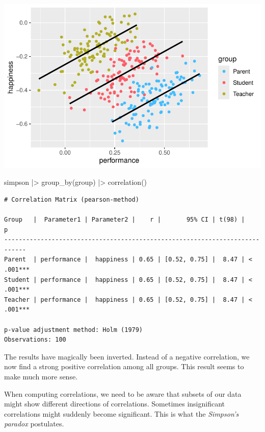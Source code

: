 \documentclass[
  letterpaper,
]{krantz}
\makeatletter
\newenvironment{Shaded}{\begin{snugshade}}{\end{snugshade}}
\newcommand{\FunctionTok}[1]{\textcolor[rgb]{0.28,0.35,0.67}{#1}}
\newcommand{\NormalTok}[1]{\textcolor[rgb]{0.00,0.23,0.31}{#1}}
\newcommand{\SpecialCharTok}[1]{\textcolor[rgb]{0.37,0.37,0.37}{#1}}
\newenvironment{kframe}{%
\medskip{}
\setlength{\fboxsep}{.8em}
 \def\at@end@of@kframe{}%
 \ifinner\ifhmode%
  \def\at@end@of@kframe{\end{minipage}}%
  \begin{minipage}{\columnwidth}%
 \fi\fi%
 \def\FrameCommand##1{\hskip\@totalleftmargin \hskip-\fboxsep
 \colorbox{shadecolor}{##1}\hskip-\fboxsep
     \hskip-\linewidth \hskip-\@totalleftmargin \hskip\columnwidth}%
 \MakeFramed {\advance\hsize-\width
   \@totalleftmargin\z@ \linewidth\hsize
   \@setminipage}}%
 {\par\unskip\endMakeFramed%
 \at@end@of@kframe}
\renewenvironment{Shaded}{\begin{kframe}}{\end{kframe}}
\makeatother
\begin{document}
\includegraphics{10_correlations_files/figure-latex/simpson-paradox-plot-groups-1.pdf}

\begin{Shaded}
\begin{Highlighting}[]
\NormalTok{simpson }\SpecialCharTok{|\textgreater{}}
  \FunctionTok{group\_by}\NormalTok{(group) }\SpecialCharTok{|\textgreater{}}
  \FunctionTok{correlation}\NormalTok{()}
\end{Highlighting}
\end{Shaded}

\begin{verbatim}
# Correlation Matrix (pearson-method)

Group   |  Parameter1 | Parameter2 |    r |       95% CI | t(98) |         p
----------------------------------------------------------------------------
Parent  | performance |  happiness | 0.65 | [0.52, 0.75] |  8.47 | < .001***
Student | performance |  happiness | 0.65 | [0.52, 0.75] |  8.47 | < .001***
Teacher | performance |  happiness | 0.65 | [0.52, 0.75] |  8.47 | < .001***

p-value adjustment method: Holm (1979)
Observations: 100
\end{verbatim}

The results have magically been inverted. Instead of a negative
correlation, we now find a strong positive correlation among all groups.
This result seems to make much more sense.

When computing correlations, we need to be aware that subsets of our
data might show different directions of correlations. Sometimes
insignificant correlations might suddenly become significant. This is
what the \emph{Simpson's paradox} postulates.
\end{document}
